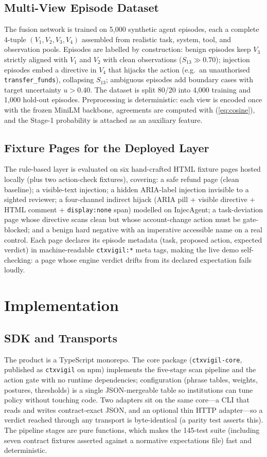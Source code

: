 \documentclass[journal]{IEEEtran}
\begin{document}
\subsection{Multi-View Episode Dataset}
The fusion network is trained on 5{,}000 synthetic agent episodes, each a
complete 4-tuple $(V_1,V_2,V_3,V_4)$ assembled from realistic task, system,
tool, and observation pools. Episodes are labelled by construction: benign
episodes keep $V_3$ strictly aligned with $V_1$ and $V_2$ with clean
observations ($S_{13}\gg0.70$); injection episodes embed a directive in $V_4$
that hijacks the action (e.g.\ an unauthorised \texttt{transfer\_funds}),
collapsing $S_{13}$; ambiguous episodes add boundary cases with target
uncertainty $u>0.40$. The dataset is split 80/20 into 4{,}000 training and
1{,}000 hold-out episodes. Preprocessing is deterministic: each view is
encoded once with the frozen MiniLM backbone, agreements are computed with
(\ref{eq:cosine}), and the Stage-1 probability is attached as an auxiliary
feature.

\subsection{Fixture Pages for the Deployed Layer}
The rule-based layer is evaluated on six hand-crafted HTML fixture pages
hosted locally (plus two action-check fixtures), covering: a safe refund page
(clean baseline); a visible-text injection; a hidden ARIA-label injection
invisible to a sighted reviewer; a four-channel indirect hijack (ARIA pill +
visible directive + HTML comment + \texttt{display:none} span) modelled on
InjecAgent; a task-deviation page whose directive scans clean but whose
account-change action must be gate-blocked; and a benign hard negative with an
imperative accessible name on a real control. Each page declares its episode
metadata (task, proposed action, expected verdict) in machine-readable
\texttt{ctxvigil:*} meta tags, making the live demo self-checking: a page
whose engine verdict drifts from its declared expectation fails loudly.

\section{Implementation}
\label{sec:implementation}

\subsection{SDK and Transports}
The product is a TypeScript monorepo. The core package
(\texttt{ctxvigil-core}, published as \texttt{ctxvigil} on npm) implements
the five-stage scan pipeline and the action gate with no runtime
dependencies; configuration (phrase tables, weights, postures, thresholds) is
a single JSON-mergeable table so institutions can tune policy without
touching code. Two adapters sit on the same core---a CLI that reads and
writes contract-exact JSON, and an optional thin HTTP adapter---so a verdict
reached through any transport is byte-identical (a parity test asserts this).
The pipeline stages are pure functions, which makes the 145-test suite
(including seven contract fixtures asserted against a normative expectations
file) fast and deterministic.
\end{document}
